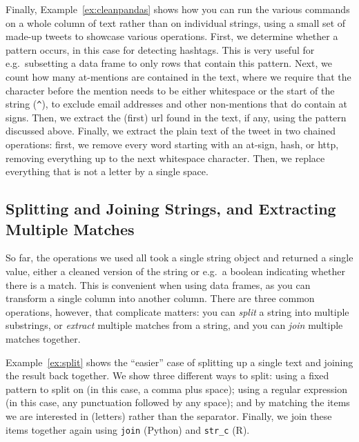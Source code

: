 Finally, Example~\ref{ex:cleanpandas} shows how you can run the various commands on a whole column of text rather than on individual strings,
using  a small set of made-up tweets to showcase various operations.
First, we determine whether a pattern occurs, in this case for detecting hashtags.
This is very useful for e.g.\ subsetting a data frame to only rows that contain this pattern.
Next, we count how many at-mentions are contained in the text, where we require that the character before the mention needs to be either whitespace or the start of the string (\verb|^|), to exclude email addresses and other non-mentions that do contain at signs.
Then, we extract the (first) url found in the text, if any, using the pattern discussed above.
Finally, we extract the plain text of the tweet in two chained operations:
first, we remove every word starting with an at-sign, hash, or http, removing everything up to the next whitespace character.
Then, we replace everything that is not a letter by a single space.



\subsection{Splitting and Joining Strings, and Extracting Multiple Matches}

So far, the operations we used all took a single string object and returned a single value,
either a cleaned version of the string or e.g.\ a boolean indicating whether there is a match.
This is convenient when using data frames, as you can transform a single column into another column.
There are three common operations, however, that complicate matters:
you can \emph{split} a string into multiple substrings, or \emph{extract} multiple matches from a string,
and you can \emph{join} multiple matches together.


Example~\ref{ex:split} shows the ``easier'' case of splitting up a single text and joining the result back together.
We show three different ways to split: using a fixed pattern to split on (in this case, a comma plus space);
using a regular expression (in this case, any punctuation followed by any space);
and by matching the items we are interested in (letters) rather than the separator.
Finally, we join these items together again using \texttt{join} (Python) and \texttt{str\_c} (R).

